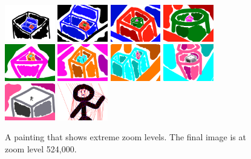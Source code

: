 \documentclass[review]{acmsiggraph}
\begin{document}
\begin{figure}
    \centering
        \includegraphics[width=0.195\textwidth]{images/zoom61}
        \includegraphics[width=0.195\textwidth]{images/zoom62}
        \includegraphics[width=0.195\textwidth]{images/zoom63}
        \includegraphics[width=0.195\textwidth]{images/zoom64}
        \includegraphics[width=0.195\textwidth]{images/zoom65}
        \includegraphics[width=0.195\textwidth]{images/zoom66}
        \includegraphics[width=0.195\textwidth]{images/zoom67}
        \includegraphics[width=0.195\textwidth]{images/zoom68}
        \includegraphics[width=0.195\textwidth]{images/zoom69}
        \includegraphics[width=0.195\textwidth]{images/zoom72}
    \caption{A painting that shows extreme zoom levels.  The final image is at zoom level 524,000.}
    \label{fig:boxes}
\end{figure}
\end{document}
